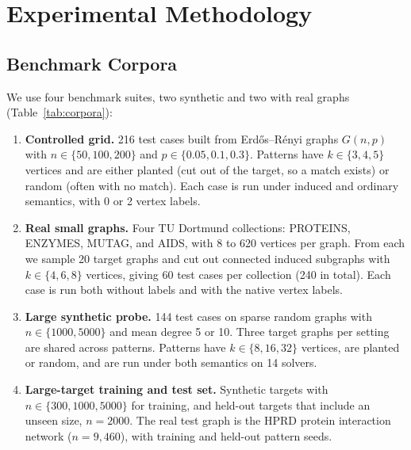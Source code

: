 \documentclass[11pt,a4paper]{article}
\begin{document}
\section{Experimental Methodology}

\subsection{Benchmark Corpora}

We use four benchmark suites, two synthetic and two with real graphs (Table~\ref{tab:corpora}):
\begin{enumerate}
    \item \textbf{Controlled grid.} 216 test cases built from Erd\H{o}s--R\'enyi graphs $G(n,p)$ with $n \in \{50, 100, 200\}$ and $p \in \{0.05, 0.1, 0.3\}$. Patterns have $k \in \{3, 4, 5\}$ vertices and are either planted (cut out of the target, so a match exists) or random (often with no match). Each case is run under induced and ordinary semantics, with 0 or 2 vertex labels.
    \item \textbf{Real small graphs.} Four TU Dortmund collections: PROTEINS, ENZYMES, MUTAG, and AIDS, with 8 to 620 vertices per graph. From each we sample 20 target graphs and cut out connected induced subgraphs with $k \in \{4, 6, 8\}$ vertices, giving 60 test cases per collection (240 in total). Each case is run both without labels and with the native vertex labels.
    \item \textbf{Large synthetic probe.} 144 test cases on sparse random graphs with $n \in \{1000, 5000\}$ and mean degree 5 or 10. Three target graphs per setting are shared across patterns. Patterns have $k \in \{8, 16, 32\}$ vertices, are planted or random, and are run under both semantics on 14 solvers.
    \item \textbf{Large-target training and test set.} Synthetic targets with $n \in \{300, 1000, 5000\}$ for training, and held-out targets that include an unseen size, $n=2000$. The real test graph is the HPRD protein interaction network ($n=9{,}460$), with training and held-out pattern seeds.
\end{enumerate}
\end{document}
